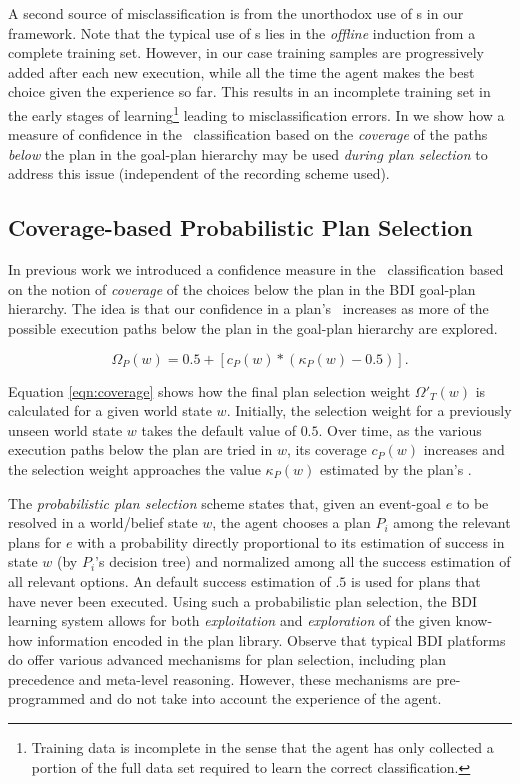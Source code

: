 A second source of misclassification is from the unorthodox use of \dt s in our framework. Note that the typical use of \dt s lies in the \textit{offline} induction from a complete training set. However, in our case training samples are progressively added after each new execution, while all the time the agent makes the best choice given the experience so far. This results in an incomplete training set in the early stages of learning\footnote{Training data is incomplete in the sense that the agent has only collected a portion of the full data set required to learn the correct classification.} leading to misclassification errors. In \cite{Singh:AAMAS10} we show how a measure of confidence in the \dt\ classification based on the \textit{coverage} of the paths \textit{below} the plan in the goal-plan hierarchy may be used \textit{during plan selection} to address this issue (independent of the recording scheme used).


\subsection{Coverage-based Probabilistic Plan Selection}

In previous work \cite{Singh:AAMAS10} we introduced a confidence measure in the \dt\ classification based on the notion of \textit{coverage} of the choices below the plan in the BDI goal-plan hierarchy. The idea is that our confidence in a plan's \dt\ increases as more of the possible execution paths below the plan in the goal-plan hierarchy are explored.

\begin{equation*}\label{eqn:coverage}   
\Omega_P(w) = 0.5 + \left[  c_P(w) *  \left( \kappa_P(w) - 0.5 \right)  \right].
\end{equation*}

Equation \ref{eqn:coverage} shows how the final plan selection weight $\Omega'_T(w)$ is calculated for a given world state $w$. Initially, the selection weight for a previously unseen world state $w$ takes the default value of $0.5$. Over time, as the various execution paths below the plan are tried in $w$, its coverage $c_P(w)$ increases and the selection weight approaches the value $\kappa_P(w)$ estimated by the plan's \dt.

The \emph{probabilistic plan selection} scheme states that, given an event-goal
$e$ to be resolved in a world/belief state $w$, the agent chooses a plan $P_i$
among the relevant plans for $e$ with a probability directly proportional to its
estimation of success in state $w$ (by $P_i$'s decision tree) and normalized
among all the success estimation of all relevant options. An default success
estimation of $.5$ is used for plans that have never been executed.
Using such a probabilistic plan selection, the BDI learning system allows for both
\emph{exploitation} and \emph{exploration} of the given know-how information
encoded in the plan library.
Observe that typical BDI platforms do offer various advanced mechanisms for plan
selection, including plan precedence and meta-level reasoning. However, these
mechanisms are pre-programmed and do not take into account the experience of the
agent.



